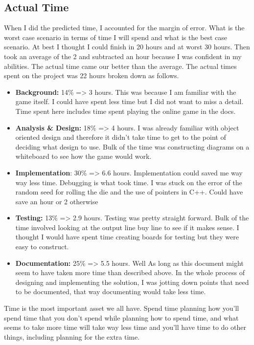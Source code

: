\subsection*{Actual Time}
When I did the predicted time, I accounted for the margin of error. What is the worst case scenario in terms of time I will spend and what is the best case scenario. At best I thought I could finish in 20 hours and at worst 30 hours. Then took an average of the 2 and subtracted an hour because I was confident in my abilities. The actual time came our better than the average. The actual times spent on the project was 22 hours broken down as follows.
\begin{itemize}
	\item \textbf{Background:} 14\% => 3 hours. This was because I am familiar with the game itself. I could have spent less time but I did not want to miss a detail. Time spent here includes time spent playing the online game in the docs.
	\item \textbf{Analysis \& Design:} 18\% => 4 hours. I was already familiar with object oriented design and therefore it didn't take time to get to the point of deciding what design to use. Bulk of the time was constructing diagrams on a whiteboard to see how the game would work.
	\item \textbf{Implementation}: 30\% => 6.6 hours. Implementation could saved me way way less time. Debugging is what took time. I was stuck on the error of the random seed for rolling the die and the use of pointers in C++. Could have save an hour or 2 otherwise
	\item \textbf{Testing:} 13\% => 2.9 hours. Testing was pretty straight forward. Bulk of the time involved looking at the output line buy line to see if it makes sense. I thought I would have spent time creating boards for testing but they were easy to construct.
	\item \textbf{Documentation:} 25\% => 5.5 hours. Well As long as this document might seem to have taken more time than described above. In the whole process of designing and implementing the solution, I was jotting down points that need to be documented, that way documenting would take less time. 
\end{itemize}

Time is the most important asset we all have. Spend time planning how you'll spend time that you don't spend while planning how to spend time, and what seems to take more time will take way less time and you'll have time to do other things, including planning for the extra time.

